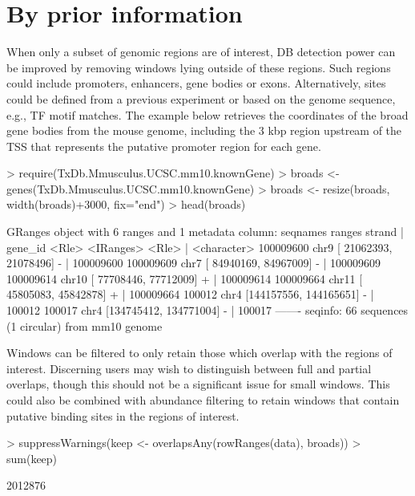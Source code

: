\documentclass[12pt]{report}
\renewenvironment{Schunk}{\vspace{0pt}}{\vspace{0pt}}
\begin{document}
\section{By prior information}
When only a subset of genomic regions are of interest, DB detection power can be improved by removing windows lying outside of these regions. 
Such regions could include promoters, enhancers, gene bodies or exons. 
Alternatively, sites could be defined from a previous experiment or based on the genome sequence, e.g., TF motif matches.
The example below retrieves the coordinates of the broad gene bodies from the mouse genome, including the 3 kbp region upstream of the TSS that represents the putative promoter region for each gene. 

\begin{Schunk}
\begin{Sinput}
> require(TxDb.Mmusculus.UCSC.mm10.knownGene)
> broads <- genes(TxDb.Mmusculus.UCSC.mm10.knownGene)
> broads <- resize(broads, width(broads)+3000, fix="end")
> head(broads)
\end{Sinput}
\begin{Soutput}
GRanges object with 6 ranges and 1 metadata column:
            seqnames                 ranges strand |     gene_id
               <Rle>              <IRanges>  <Rle> | <character>
  100009600     chr9 [ 21062393,  21078496]      - |   100009600
  100009609     chr7 [ 84940169,  84967009]      - |   100009609
  100009614    chr10 [ 77708446,  77712009]      + |   100009614
  100009664    chr11 [ 45805083,  45842878]      + |   100009664
     100012     chr4 [144157556, 144165651]      - |      100012
     100017     chr4 [134745412, 134771004]      - |      100017
  -------
  seqinfo: 66 sequences (1 circular) from mm10 genome
\end{Soutput}
\end{Schunk}
 
Windows can be filtered to only retain those which overlap with the regions of interest. 
Discerning users may wish to distinguish between full and partial overlaps, though this should not be a significant issue for small windows.
This could also be combined with abundance filtering to retain windows that contain putative binding sites in the regions of interest.

\begin{Schunk}
\begin{Sinput}
> suppressWarnings(keep <- overlapsAny(rowRanges(data), broads))
> sum(keep)
\end{Sinput}
\begin{Soutput}
[1] 2012876
\end{Soutput}
\end{Schunk}
\end{document}
